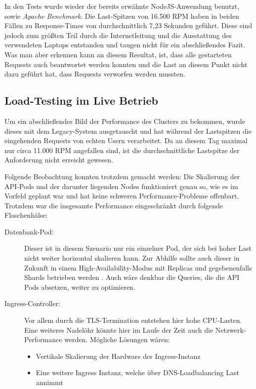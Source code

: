 In den Tests wurde wieder der bereits erwähnte NodeJS-Anwendung benutzt,
sowie \emph{Apache Benchmark}. Die Last-Spitzen von 16.500 RPM haben in beiden
Fällen zu
Response-Times von durchschnittlich 7,23 Sekunden geführt.
Diese sind jedoch zum größten Teil durch die Internetleitung und die
Ausstattung des verwendeten Laptops entstanden und taugen nicht für ein
abschließendes Fazit. Was man aber erkennen kann an diesem Resultat, ist,
dass
alle gestarteten Requests auch beantwortet werden konnten und die
Last an diesem
Punkt nicht dazu geführt hat, dass Requests verworfen werden mussten.

\subsection{Load-Testing im Live Betrieb}

Um ein abschließendes Bild der Performance des Clusters zu bekommen,
wurde dieses mit dem Legacy-System ausgetauscht und hat während der
Lastspitzen die eingehenden Requests von echten Usern verarbeitet.
Da an diesem Tag maximal nur circa 11.000 RPM angefallen sind, ist die
durchschnittliche Lastspitze der Anforderung nicht erreicht gewesen.

Folgende Beobachtung konnten trotzdem gemacht werden:
Die Skalierung der API-Pods und der darunter liegenden Nodes funktioniert
genau so, wie es im Vorfeld geplant war und hat keine schweren
Performance-Probleme offenbart.
Trotzdem war die insgesamte Performance eingeschränkt
durch folgende Flaschenhälse:
\begin{description}
  \item[Datenbank-Pod:] Dieser ist in diesem Szenario nur ein einzelner Pod,
  der sich bei hoher Last nicht weiter horizontal skalieren kann.
  Zur Abhilfe sollte auch dieser in Zukunft in einem
  High-Availability-Modus mit Replicas und gegebenenfalls Shards betrieben
  werden \cite{Vohra}. Auch wäre denkbar die Queries, die die API Pods absetzen, weiter
  zu optimieren.
  \item[Ingress-Controller:]
  Vor allem durch die TLS-Termination entstehen hier hohe CPU-Lasten.
  Eine weiteres Nadelöhr könnte hier im Laufe der Zeit auch die
  Netzwerk-Performance werden.
  Mögliche Lösungen wären:
  \begin{itemize}
    \item Vertikale Skalierung der Hardware der Ingress-Instanz
    \item Eine weitere
    Ingress Instanz, welche über DNS-Loadbalancing Last annimmt
  \end{itemize}
\end{description}

